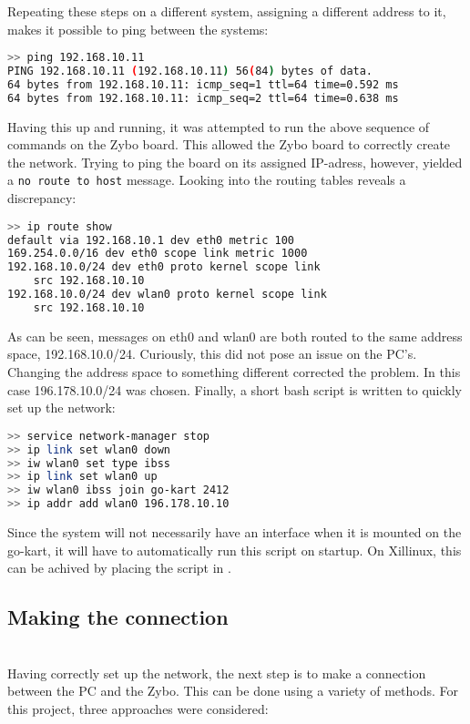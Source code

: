 Repeating these steps on a different system, assigning a different address to it, makes it possible to ping between the systems: 
\begin{lstlisting}[language=bash]
>> ping 192.168.10.11
PING 192.168.10.11 (192.168.10.11) 56(84) bytes of data.
64 bytes from 192.168.10.11: icmp_seq=1 ttl=64 time=0.592 ms
64 bytes from 192.168.10.11: icmp_seq=2 ttl=64 time=0.638 ms
\end{lstlisting}
Having this up and running, it was attempted to run the above sequence of commands on the Zybo board.
This allowed the Zybo board to correctly create the network.
Trying to ping the board on its assigned IP-adress, however, yielded a \texttt{no route to host} message.
Looking into the routing tables reveals a discrepancy:
\begin{lstlisting}[language=bash]
>> ip route show
default via 192.168.10.1 dev eth0 metric 100 
169.254.0.0/16 dev eth0 scope link metric 1000 
192.168.10.0/24 dev eth0 proto kernel scope link 
	src 192.168.10.10 
192.168.10.0/24 dev wlan0 proto kernel scope link 
	src 192.168.10.10
\end{lstlisting}
As can be seen, messages on eth0 and wlan0 are both routed to the same address space, 192.168.10.0/24.
Curiously, this did not pose an issue on the PC's.
Changing the address space to something different corrected the problem.
In this case 196.178.10.0/24 was chosen.
Finally, a short bash script is written to quickly set up the network:
\begin{lstlisting}[language=bash]
>> service network-manager stop
>> ip link set wlan0 down
>> iw wlan0 set type ibss
>> ip link set wlan0 up
>> iw wlan0 ibss join go-kart 2412
>> ip addr add wlan0 196.178.10.10
\end{lstlisting}
Since the system will not necessarily have an interface when it is mounted on the go-kart, it will have to automatically run this script on startup.
On Xillinux, this can be achived by placing the script in .

\subsection{Making the connection}~\\
Having correctly set up the network, the next step is to make a connection between the PC and the Zybo.
This can be done using a variety of methods.
For this project, three approaches were considered:

